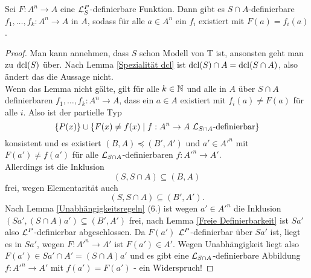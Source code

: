 \begin{lemma}
	Sei $F:A^n\rightarrow A$ eine $\mathcal{L}^P_S$-definierbare Funktion. Dann gibt es $S\cap A$-definierbare $f_1,\dots,f_k:A^n\rightarrow A$ in $A$, sodass für alle $a\in A^n$ ein $f_i$ existiert mit $F(a)=f_i(a)$.
\end{lemma}
\begin{proof}
	Man kann annehmen, dass $S$ schon Modell von T ist, ansonsten geht man zu $\operatorname{dcl}(S)$ über. Nach Lemma \ref{Spezialität dcl} ist $\operatorname{dcl}(S)\cap A=\operatorname{dcl}(S\cap A)$, also ändert das die Aussage nicht.\\
	Wenn das Lemma nicht gälte, gilt für alle $k\in\mathbb{N}$ und alle in $A$ über $S\cap A$ definierbaren $f_1,\dots,f_k:A^n\rightarrow A$, dass ein $a\in A$ existiert mit $f_i(a)\neq F(a)$ für alle $i$. Also ist der partielle Typ $$\{P(x)\}\cup\{F(x)\neq f(x)\mid f:A^n\rightarrow A\ \mathcal{L}_{S\cap A}\text{-definierbar}\}$$ konsistent und es existiert $(B,A)\preceq(B',A')$ und $a'\in A'^n$ mit $F(a')\neq f(a')$ für alle $\mathcal{L}_{S\cap A}$-definierbaren $f:A'^n\rightarrow A'$.\\
	Allerdings ist die Inklusion $$(S,S\cap A)\subseteq (B,A)$$ frei, wegen Elementarität auch $$(S,S\cap A)\subseteq (B',A').$$ Nach Lemma \ref{Unabhängigkeitsregeln} (6.) ist wegen $a'\in A'^n$ die Inklusion $(Sa',(S\cap A)a')\subseteq(B',A')$ frei, nach Lemma \ref{Freie Definierbarkeit} ist $Sa'$ also $\mathcal{L}^P$-definierbar abgeschlossen. Da $F(a')$ $\mathcal{L}^P$-definierbar über $Sa'$ ist, liegt es in $Sa'$, wegen $F:A'^n\rightarrow A'$ ist $F(a')\in A'$. Wegen Unabhängigkeit liegt also $F(a')\in Sa'\cap A'=(S\cap A)a'$ und es gibt eine $\mathcal{L}_{S\cap A}$-definierbare Abbildung $f:A'^n\rightarrow A'$ mit $f(a')=F(a')$ - ein Widerspruch!
\end{proof}

